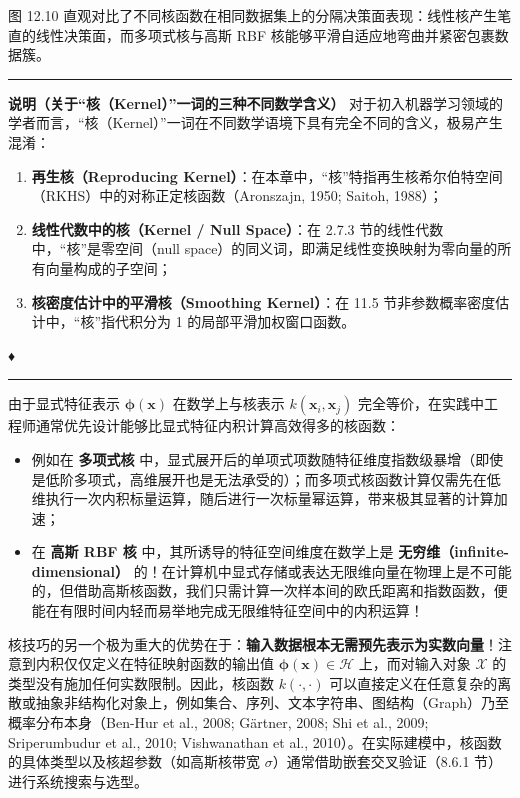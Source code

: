 图 12.10 直观对比了不同核函数在相同数据集上的分隔决策面表现：线性核产生笔直的线性决策面，而多项式核与高斯 RBF 核能够平滑自适应地弯曲并紧密包裹数据簇。

\medskip\hrule\medskip

\textbf{说明（关于“核（Kernel）”一词的三种不同数学含义）} 对于初入机器学习领域的学者而言，“核（Kernel）”一词在不同数学语境下具有完全不同的含义，极易产生混淆：

\begin{enumerate}
\item \textbf{再生核（Reproducing Kernel）}：在本章中，“核”特指再生核希尔伯特空间（RKHS）中的对称正定核函数（Aronszajn, 1950; Saitoh, 1988）；
\item \textbf{线性代数中的核（Kernel / Null Space）}：在 2.7.3 节的线性代数中，“核”是零空间（null space）的同义词，即满足线性变换映射为零向量的所有向量构成的子空间；
\item \textbf{核密度估计中的平滑核（Smoothing Kernel）}：在 11.5 节非参数概率密度估计中，“核”指代积分为 1 的局部平滑加权窗口函数。  
\end{enumerate}

♦

\medskip\hrule\medskip

由于显式特征表示 $ \boldsymbol{\phi}(\boldsymbol{x}) $ 在数学上与核表示 $ k(\boldsymbol{x}_i, \boldsymbol{x}_j) $ 完全等价，在实践中工程师通常优先设计能够比显式特征内积计算高效得多的核函数：

\begin{itemize}
\item 例如在 \textbf{多项式核} 中，显式展开后的单项式项数随特征维度指数级暴增（即使是低阶多项式，高维展开也是无法承受的）；而多项式核函数计算仅需先在低维执行一次内积标量运算，随后进行一次标量幂运算，带来极其显著的计算加速；
\item 在 \textbf{高斯 RBF 核} 中，其所诱导的特征空间维度在数学上是 \textbf{无穷维（infinite-dimensional）} 的！在计算机中显式存储或表达无限维向量在物理上是不可能的，但借助高斯核函数，我们只需计算一次样本间的欧氏距离和指数函数，便能在有限时间内轻而易举地完成无限维特征空间中的内积运算！
\end{itemize}

核技巧的另一个极为重大的优势在于：\textbf{输入数据根本无需预先表示为实数向量}！注意到内积仅仅定义在特征映射函数的输出值 $ \boldsymbol{\phi}(\boldsymbol{x}) \in \mathcal{H} $ 上，而对输入对象 $ \mathcal{X} $ 的类型没有施加任何实数限制。因此，核函数 $ k(\cdot, \cdot) $ 可以直接定义在任意复杂的离散或抽象非结构化对象上，例如集合、序列、文本字符串、图结构（Graph）乃至概率分布本身（Ben-Hur et al., 2008; Gärtner, 2008; Shi et al., 2009; Sriperumbudur et al., 2010; Vishwanathan et al., 2010）。在实际建模中，核函数的具体类型以及核超参数（如高斯核带宽 $ \sigma $）通常借助嵌套交叉验证（8.6.1 节）进行系统搜索与选型。

